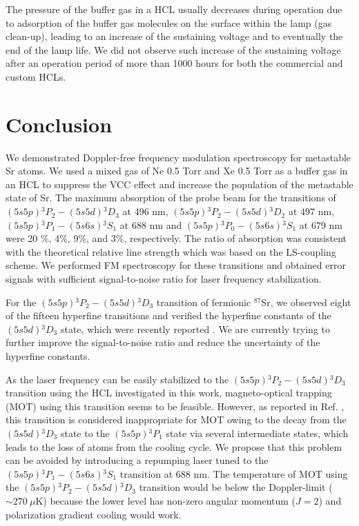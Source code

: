 \documentclass[twocolumn,10pt,a4paper]{article}
\begin{document}
The pressure of the buffer gas in a HCL usually decreases during operation due to adsorption of the buffer gas molecules on the surface within the lamp (gas clean-up), leading to an increase of the sustaining voltage and to eventually the end of the lamp life. We did not observe such increase of the sustaining voltage after an operation period of more than 1000 hours for both the commercial and custom HCLs.

\section{Conclusion}
We demonstrated Doppler-free frequency modulation spectroscopy for metastable Sr atoms. We used a mixed gas of Ne 0.5 Torr and Xe 0.5 Torr as a buffer gas in an HCL to suppress the VCC effect and increase the population of the metastable state of Sr. The maximum absorption of the probe beam for the transitions of $(5s5p){}^3P_2-(5s5d){}^3D_3$ at 496 nm, $(5s5p){}^3P_2-(5s5d){}^3D_2$ at 497 nm, $(5s5p){}^3P_1-(5s6s){}^3S_1$ at 688 nm and $(5s5p){}^3P_0-(5s6s){}^3S_1$ at 679 nm were 20 \%, 4\%, 9\%, and 3\%, respectively. The ratio of absorption was consistent with the theoretical relative line strength which was based on the LS-coupling scheme. We performed FM spectroscopy for these transitions and obtained error signals with sufficient signal-to-noise ratio for laser frequency stabilization.

For the $(5s5p){}^3P_2-(5s5d){}^3D_3$ transition of fermionic $\mathrm{{}^{87}Sr}$, we observed eight of the fifteen hyperfine transitions and verified the hyperfine constants of the $(5s5d){}^3D_3$ state, which were recently reported \cite{energylevel3}. We are currently trying to further improve the signal-to-noise ratio and reduce the uncertainty of the hyperfine constants.

As the laser frequency can be easily stabilized to the $(5s5p){}^3P_2-(5s5d){}^3D_3$ transition using the HCL investigated in this work, magneto-optical trapping (MOT) using this transition seems to be feasible. However, as reported in Ref. \cite{energylevel3}, this transition is considered inappropriate for MOT owing to the decay from the $(5s5d){}^3D_3$ state to the $(5s5p){}^3P_1$ state via several intermediate states, which leads to the loss of atoms from the cooling cycle. We propose that this problem can be avoided by introducing a repumping laser tuned to the $(5s5p){}^3P_1-(5s6s){}^3S_1$ transition at 688 nm. The temperature of MOT using the $(5s5p){}^3P_2-(5s5d){}^3D_3$ transition would be below the Doppler-limit ($\sim 270\ \mu \mathrm{K}$) because the lower level has non-zero angular momentum ($J=2$) and polarization gradient cooling would work.
\end{document}

